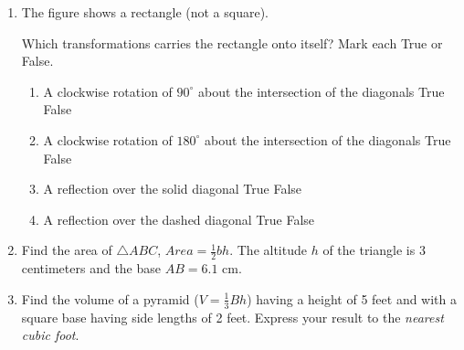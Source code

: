 \documentclass[12pt, twoside]{article}
\begin{document}
\begin{enumerate}
\item The figure shows a rectangle (not a square).
  \begin{center}
  \end{center}
  Which transformations carries the rectangle onto itself? Mark each True or False.
    \begin{enumerate}
      \item A clockwise rotation of $90^\circ$ about the intersection of the diagonals \hfill True \quad False
      \item A clockwise rotation of $180^\circ$ about the intersection of the diagonals \hfill True \quad False
      \item A reflection over the solid diagonal \hfill True \quad False
      \item A reflection over the dashed diagonal \hfill True \quad False
    \end{enumerate}
    \vspace{1cm}

   \item Find the area of $\triangle ABC$,  $Area= \frac{1}{2}bh$. The altitude $h$ of the triangle is 3 centimeters and the base $AB=6.1$ cm.\\[1cm]

   \item Find the volume of a pyramid ($V=\frac{1}{3}Bh$) having a height of 5 feet and with a square base having side lengths of 2 feet. Express your result to the \emph{nearest cubic foot}. \vspace{5cm}


\end{enumerate}
\end{document}
